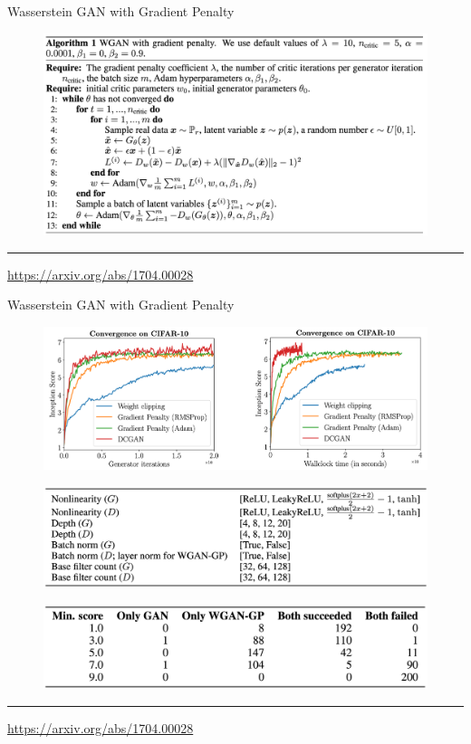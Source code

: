 \begin{frame}{Wasserstein GAN with Gradient Penalty}
	
	\begin{figure}
		\centering
		\includegraphics[width=1.0\linewidth]{figs/wgan_gp_pseudocode}
	\end{figure}
	
	\vfill
	\hrule\medskip 
	{\scriptsize \href{https://arxiv.org/abs/1704.00028}{https://arxiv.org/abs/1704.00028}}
	
\end{frame}
\begin{frame}{Wasserstein GAN with Gradient Penalty}
	\begin{figure}
		\centering
		\includegraphics[width=0.9\linewidth]{figs/wgan_gp_convergence}
	\end{figure}
	\begin{figure}
		\centering
		\includegraphics[width=0.65\linewidth]{figs/wgan_gp_model_space}
	\end{figure}
	\begin{figure}
		\centering
		\includegraphics[width=0.65\linewidth]{figs/wgan_gp_wgan}
	\end{figure}
	\vfill
	\hrule\medskip 
	{\scriptsize \href{https://arxiv.org/abs/1704.00028}{https://arxiv.org/abs/1704.00028}}
	
\end{frame}
